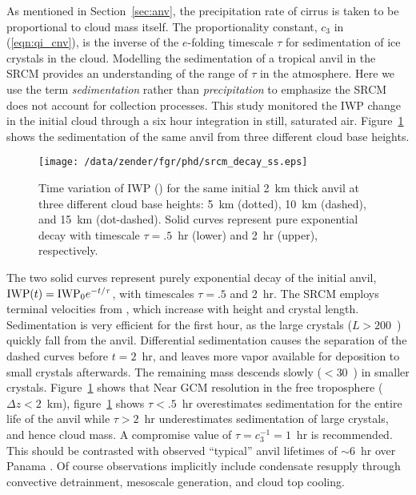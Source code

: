 \documentclass[twoside,agums]{aguplus}
\begin{document}
As mentioned in Section~\ref{sec:anv}, the precipitation rate of
cirrus is taken to be proportional to cloud mass itself.
The proportionality constant, $c_3$ in (\ref{eqn:qi_cnv}), is the
inverse of the $e$-folding timescale $\tau$ for sedimentation of ice
crystals in the cloud.
Modelling the sedimentation of a tropical anvil in the SRCM provides an
understanding of the range of $\tau$ in the atmosphere.
Here we use the term \textit{sedimentation} rather than
\textit{precipitation} to emphasize the SRCM does not account for
collection processes.
This study monitored the IWP change in the initial cloud through
a six hour integration in still, saturated air.
Figure~\ref{fig:srcm_decay_ss} shows the sedimentation of the same
anvil from three different cloud base heights.
\begin{figure}
\begin{center}
\texttt{[image: /data/zender/fgr/phd/srcm\_decay\_ss.eps]}
\end{center}
\caption[Time variation of IWP (\gxmS) for the same initial 2~km
thick anvil at three different cloud base heights]{
Time variation of IWP (\gxmS) for the same initial 2~km
thick anvil at three different cloud base heights: 5~km (dotted),
10~km (dashed), and 15~km (dot-dashed).
Solid curves represent pure exponential decay with timescale $\tau =
.5$~hr (lower) and 2~hr (upper),
respectively.\label{fig:srcm_decay_ss}}    
\end{figure}
The two solid curves represent purely exponential decay of the initial
anvil, $\mbox{\textrm{IWP}}(t) = \mbox{\textrm{IWP}}_0 e^{-t/\tau}$, with timescales $\tau = .5$
and 2~hr. 
The SRCM employs terminal velocities from \cite{Hey72}, which increase 
with height and crystal length.
Sedimentation is very efficient for the first hour, as the large
crystals ($L > 200$~\um) quickly fall from the anvil.
Differential sedimentation causes the separation of the dashed
curves before $t = 2$~hr, and leaves more vapor available for
deposition to small crystals afterwards.
The remaining mass descends slowly ($< 30$~\cmxs) in smaller crystals. 
Figure~\ref{fig:srcm_decay_ss} shows that 
Near GCM resolution in the free troposphere ($\Delta z < 2$~km), 
figure~\ref{fig:srcm_decay_ss} shows $\tau < .5$~hr overestimates 
sedimentation for the entire life of the anvil while $\tau >
2$~hr underestimates sedimentation of large crystals, and hence
cloud mass.
A compromise value of $\tau = c_3^{-1} = 1$~hr is recommended.
This should be contrasted with observed ``typical'' anvil lifetimes of
$\sim 6$~hr over Panama \cite[]{ALV88}. 
Of course observations implicitly include condensate resupply
through convective detrainment, mesoscale generation, and cloud top 
cooling. 
\end{document}

